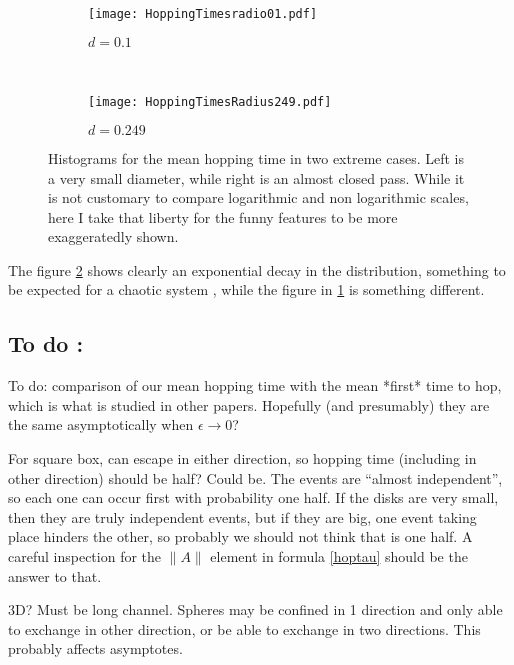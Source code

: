 \documentclass[a4paper,10pt, jcp, aps, preprint]{revtex4-1}
\begin{document}
\begin{figure}[h]
        \centering
        \begin{subfigure}[b]{0.45\textwidth}
                \centering
                \texttt{[image: HoppingTimesradio01.pdf]}
                \caption{$d=0.1$}
                \label{smallradious}
        \end{subfigure}%
        ~ %
        \begin{subfigure}[b]{0.45\textwidth}
                \centering
                \texttt{[image: HoppingTimesRadius249.pdf]}
                \caption{$d=0.249$}
                \label{bigradious}
        \end{subfigure}       
        \caption{Histograms for the mean hopping time
in two extreme cases. Left is a very small diameter, while right is an almost
closed pass. While it is not customary to compare logarithmic and non
logarithmic scales, here I take that liberty for the funny features to be
more exaggeratedly shown.}\label{histohopps}
\end{figure}

The figure \ref{bigradious} shows clearly an exponential decay in the
distribution, something to be expected for a chaotic system \cite{OttLibro} , while the
figure in \ref{smallradious} is something different. 


\subsection{ To do : }
To do: comparison of our mean hopping time with the mean *first* time to hop, which is what is studied in other papers.
Hopefully (and presumably) they are the same asymptotically when $\epsilon \to 0$? 

For square box, can escape in either direction, so hopping time (including in other direction) should be half? Could be. The events are ``almost independent'', so each one
can occur first with probability one half. If the disks are very small, then
they are truly independent events, but if they are big, one event taking
place hinders the other, so probably we should not think that is 
one half. A careful inspection for the $\|A\|$ element in formula \ref{hoptau}
should be the answer to that.


 3D?  Must be long channel. Spheres may be confined in 1 direction  
and only able to exchange in other direction, or be able to exchange in two directions.
This probably affects asymptotes.
\end{document}
